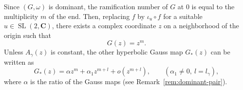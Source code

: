 \documentclass[a4paper]{amsart}
\theoremstyle{plain}
\theoremstyle{remark}
\numberwithin{equation}{section}
\begin{document}
Since $(G,\omega)$ is dominant, the ramification number of $G$ at $0$
is equal to the multiplicity $m$ of the end.
Then, replacing $f$ by $\iota_u\circ f$
for a suitable $u \in {\operatorname{SL}}(2,{\boldsymbol{C}})$,
there exists a complex coordinate $z$ on a neighborhood of the origin
such that
\begin{equation}\label{eq:normal-gauss-coord}
  G(z) = z^m.
\end{equation}
Unless $A_\gamma(z)$ is constant, the other hyperbolic Gauss map
$G_*(z)$ can be written as 
\begin{equation}\label{eq:normal-gauss-coord2}
   G_*(z)=\alpha z^m+\alpha_1 z^{m+l}+o(z^{m+l}),
       \qquad (\alpha_1\ne 0,~ l=l_\gamma), 
\end{equation}
where $\alpha$ is the ratio of the Gauss maps
(see Remark~\ref{rem:dominant-pair}).
\end{document}
